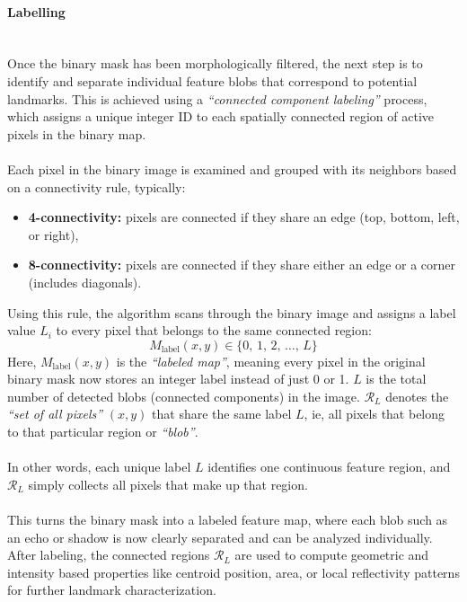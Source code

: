 \paragraph{Labelling} \mbox{}\\[0.5em] \noindent
Once the binary mask has been morphologically filtered, the next step is to identify and separate individual feature blobs that correspond to potential landmarks. This is achieved using a \textit{``connected component labeling''} process, which assigns a unique integer ID to each spatially connected region of active pixels in the binary map.  
\\ \\
Each pixel in the binary image is examined and grouped with its neighbors based on a connectivity rule, typically:
\begin{itemize}
    \item \textbf{4-connectivity:} pixels are connected if they share an edge (top, bottom, left, or right),
    \item \textbf{8-connectivity:} pixels are connected if they share either an edge or a corner (includes diagonals).
\end{itemize}
Using this rule, the algorithm scans through the binary image and assigns a label value $L_i$ to every pixel that belongs to the same connected region:
$$
    M_\text{label}(x,y) \in \{0,\, 1,\, 2,\, \dots,\, L\}
$$
Here, $M_\text{label}(x,y)$ is the \textit{``labeled map''}, meaning every pixel in the original binary mask now stores an integer label instead of just 0 or 1. $L$ is the total number of detected blobs (connected components) in the image. $\mathcal{R}_L$ denotes the \textit{``set of all pixels''} $(x,y)$ that share the same label $L$, ie, all pixels that belong to that particular region or \textit{``blob''}.  
\\ \\
In other words, each unique label $L$ identifies one continuous feature region, and $\mathcal{R}_L$ simply collects all pixels that make up that region.  
\\ \\
This turns the binary mask into a labeled feature map, where each blob such as an echo or shadow is now clearly separated and can be analyzed individually. After labeling, the connected regions $\mathcal{R}_L$ are used to compute geometric and intensity based properties like centroid position, area, or local reflectivity patterns for further landmark characterization.

